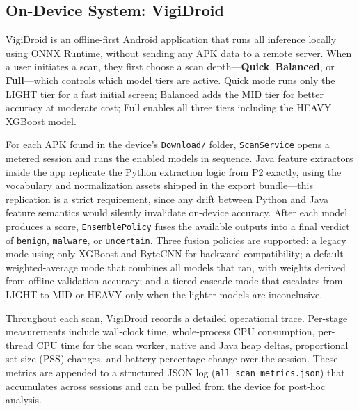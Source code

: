 \subsection{On-Device System: VigiDroid}
 
VigiDroid is an offline-first Android application that runs all inference locally using ONNX Runtime, without sending any APK data to a remote server. When a user initiates a scan, they first choose a scan depth---\textbf{Quick}, \textbf{Balanced}, or \textbf{Full}---which controls which model tiers are active. Quick mode runs only the LIGHT tier for a fast initial screen; Balanced adds the MID tier for better accuracy at moderate cost; Full enables all three tiers including the HEAVY XGBoost model.
 
For each APK found in the device's \texttt{Download/} folder, \texttt{ScanService} opens a metered session and runs the enabled models in sequence. Java feature extractors inside the app replicate the Python extraction logic from P2 exactly, using the vocabulary and normalization assets shipped in the export bundle---this replication is a strict requirement, since any drift between Python and Java feature semantics would silently invalidate on-device accuracy. After each model produces a score, \texttt{EnsemblePolicy} fuses the available outputs into a final verdict of \texttt{benign}, \texttt{malware}, or \texttt{uncertain}. Three fusion policies are supported: a legacy mode using only XGBoost and ByteCNN for backward compatibility; a default weighted-average mode that combines all models that ran, with weights derived from offline validation accuracy; and a tiered cascade mode that escalates from LIGHT to MID or HEAVY only when the lighter models are inconclusive.
 
Throughout each scan, VigiDroid records a detailed operational trace. Per-stage measurements include wall-clock time, whole-process CPU consumption, per-thread CPU time for the scan worker, native and Java heap deltas, proportional set size (PSS) changes, and battery percentage change over the session. These metrics are appended to a structured JSON log (\texttt{all\_scan\_metrics.json}) that accumulates across sessions and can be pulled from the device for post-hoc analysis.
 

